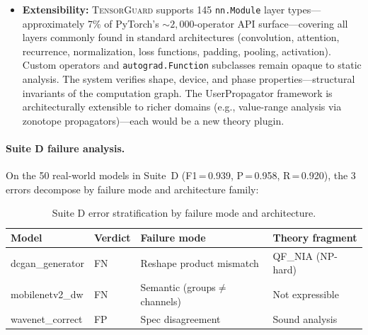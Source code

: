 \documentclass[11pt]{article}
\begin{document}
\begin{itemize}[leftmargin=2em]
    (Table~\ref{tab:branch-scaling}).
    BDD-based state representation or partial-order reduction
    could reduce this penalty.
  \item \textbf{Extensibility:} \textsc{TensorGuard}
    supports 145 \texttt{nn.Module} layer types---approximately 7\% of
    PyTorch's ${\sim}2{,}000$-operator API surface---covering all layers
    commonly found in standard architectures (convolution, attention,
    recurrence, normalization, loss functions, padding, pooling, activation).
    Custom operators and \texttt{autograd.Function} subclasses remain opaque
    to static analysis. The system verifies shape, device, and phase
    properties---structural invariants of the computation graph.
    The UserPropagator framework is architecturally extensible
    to richer domains (e.g., value-range analysis via zonotope
    propagators)---each would be a new theory plugin.
\end{itemize}

\paragraph{Suite D failure analysis.}
On the 50 real-world models in Suite~D (F1\,=\,0.939,
P\,=\,0.958, R\,=\,0.920), the 3 errors decompose by failure mode
and architecture family:

\begin{table}[h]
\centering
\caption{Suite D error stratification by failure mode and architecture.}
\label{tab:suite-d-errors}
\small
\begin{tabular}{@{}llll@{}}
\toprule
\textbf{Model} & \textbf{Verdict} & \textbf{Failure mode} & \textbf{Theory fragment} \\
\midrule
dcgan\_generator & FN & Reshape product mismatch & QF\_NIA (NP-hard) \\
mobilenetv2\_dw & FN & Semantic (groups$\neq$channels) & Not expressible \\
wavenet\_correct & FP & Spec disagreement & Sound analysis \\
\bottomrule
\end{tabular}
\end{table}
\end{document}
